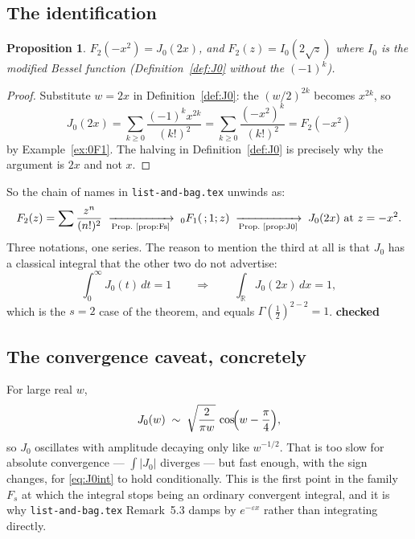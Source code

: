 \documentclass[11pt,a4paper]{article}
\newtheorem{proposition}[theorem]{Proposition}
\theoremstyle{definition}
\theoremstyle{remark}
\newcommand{\RR}{\mathbb{R}}
\newcommand{\norm}[1]{\lvert #1 \rvert}
\newcommand{\dd}{\,d}
\newcommand{\OK}{\textcolor{okgreen}{\textbf{checked}}}
\begin{document}
\subsection{The identification}

\begin{proposition}\label{prop:J0}
$F_2(-x^2) = J_0(2x)$, and $F_2(z) = I_0(2\sqrt{z})$ where $I_0$ is the modified
Bessel function (Definition~\ref{def:J0} without the $(-1)^k$).
\end{proposition}

\begin{proof}
Substitute $w = 2x$ in Definition~\ref{def:J0}: the $(w/2)^{2k}$ becomes $x^{2k}$, so
\[
  J_0(2x) = \sum_{k\ge0}\frac{(-1)^k x^{2k}}{(k!)^2}
          = \sum_{k\ge0}\frac{(-x^2)^k}{(k!)^2}
          = F_2(-x^2)
\]
by Example~\ref{ex:0F1}. The halving in Definition~\ref{def:J0} is precisely why the
argument is $2x$ and not $x$.
\end{proof}

So the chain of names in \texttt{list-and-bag.tex} unwinds as:
\[
  F_2(z) = \sum \frac{z^n}{(n!)^2}
  \;\xrightarrow[\text{Prop.~\ref{prop:Fs}}]{}\; {}_0F_1(\,;1;z)
  \;\xrightarrow[\text{Prop.~\ref{prop:J0}}]{}\; J_0(2x) \text{ at } z = -x^2 .
\]
Three notations, one series. The reason to mention the third at all is that $J_0$ has
a classical integral that the other two do not advertise:
\begin{equation}\label{eq:J0int}
  \int_0^\infty J_0(t)\dd t = 1
  \qquad\Longrightarrow\qquad
  \int_{\RR} J_0(2x)\dd x = 1 ,
\end{equation}
which is the $s = 2$ case of the theorem, and equals $\Gamma(\tfrac12)^{2-2} = 1$. \OK

\subsection{The convergence caveat, concretely}

For large real $w$,
\[
  J_0(w) \;\sim\; \sqrt{\frac{2}{\pi w}}\,\cos\!\Bigl(w - \frac{\pi}{4}\Bigr) ,
\]
so $J_0$ oscillates with amplitude decaying only like $w^{-1/2}$. That is too slow for
absolute convergence --- $\int \norm{J_0}$ diverges --- but fast enough, with the sign
changes, for \eqref{eq:J0int} to hold conditionally. This is the first point in the
family $F_s$ at which the integral stops being an ordinary convergent integral, and it
is why \texttt{list-and-bag.tex} Remark~5.3 damps by $e^{-\varepsilon x}$ rather than
integrating directly.
\end{document}
